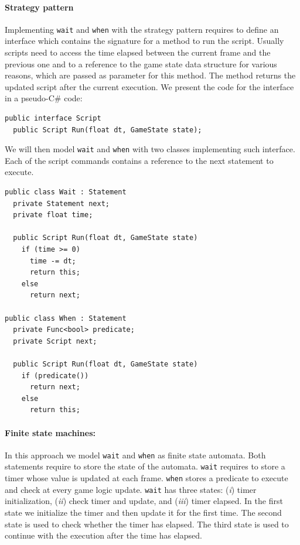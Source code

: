 \paragraph{Strategy pattern} Implementing \texttt{wait} and \texttt{when} with the strategy pattern requires to define an interface which contains the signature for a method to run the script. Usually scripts need to access the time elapsed between the current frame and the previous one and to a reference to the game state data structure for various reasons, which are passed as parameter for this method. The method returns the updated script after the current execution. We present the code for the interface in a pseudo-C\# code:

\begin{lstlisting}
public interface Script
  public Script Run(float dt, GameState state);
\end{lstlisting}

We will then model \texttt{wait} and \texttt{when} with two classes implementing such interface. Each of the script commands contains a reference to the next statement to execute.

\begin{lstlisting}
public class Wait : Statement
  private Statement next;
  private float time;
  
  public Script Run(float dt, GameState state)
    if (time >= 0)
      time -= dt;
      return this;
    else
      return next;

public class When : Statement
  private Func<bool> predicate;
  private Script next;
  
  public Script Run(float dt, GameState state)
    if (predicate())
      return next;
    else
      return this;
\end{lstlisting}

\paragraph{Finite state machines:} In this approach we model \texttt{wait} and \texttt{when} as finite state automata. Both statements require to store the state of the automata. \texttt{wait} requires to store a timer whose value is updated at each frame. \texttt{when} stores a predicate to execute and check at every game logic update. \texttt{wait} has three states: (\textit{i}) timer initialization, (\textit{ii}) check timer and update, and (\textit{iii}) timer elapsed. In the first state we initialize the timer and then update it for the first time. The second state is used to check whether the timer has elapsed. The third state is used to continue with the execution after the time has elapsed.

